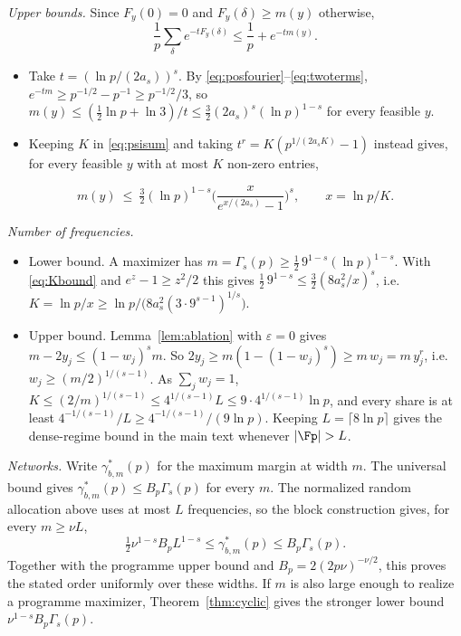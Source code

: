 \emph{Upper bounds.} Since $F_y(0)=0$ and $F_y(\delta)\ge m(y)$ otherwise,
\begin{equation}
\frac1p\sum_\delta e^{-tF_y(\delta)}\le\frac1p+e^{-tm(y)}.
\label{eq:twoterms}
\end{equation}
\begin{itemize}
\item Take $t=(\ln p/(2a_s))^s$. By \eqref{eq:posfourier}--\eqref{eq:twoterms}, $e^{-tm}\ge p^{-1/2}-p^{-1}\ge p^{-1/2}/3$, so $m(y)\le(\frac12\ln p+\ln3)/t\le\frac32(2a_s)^s(\ln p)^{1-s}$ for every feasible $y$.
\item Keeping $K$ in \eqref{eq:psisum} and taking $t^r=K(p^{1/(2a_sK)}-1)$ instead gives, for every feasible $y$ with at most $K$ non-zero entries,
\end{itemize}
\begin{equation}
m(y)\ \le\ \tfrac32(\ln p)^{1-s}\Big(\frac{x}{e^{x/(2a_s)}-1}\Big)^s,\qquad x=\ln p/K.
\label{eq:Kbound}
\end{equation}

\emph{Number of frequencies.}
\begin{itemize}
\item Lower bound. A maximizer has $m=\Gamma_s(p)\ge\tfrac12\,9^{1-s}(\ln p)^{1-s}$. With \eqref{eq:Kbound} and $e^z-1\ge z^2/2$ this gives $\tfrac12\,9^{1-s}\le\frac32(8a_s^2/x)^s$, i.e.\ $K=\ln p/x\ge\ln p/\big(8a_s^2(3\cdot9^{s-1})^{1/s}\big)$.
\item Upper bound. Lemma~\ref{lem:ablation} with $\varepsilon=0$ gives $m-2y_j\le(1-w_j)^sm$. So $2y_j\ge m(1-(1-w_j)^s)\ge m\,w_j=m\,y_j^r$, i.e.\ $w_j\ge(m/2)^{1/(s-1)}$. As $\sum_jw_j=1$, $K\le(2/m)^{1/(s-1)}\le4^{1/(s-1)}L\le9\cdot4^{1/(s-1)}\ln p$, and every share is at least $4^{-1/(s-1)}/L\ge4^{-1/(s-1)}/(9\ln p)$. Keeping $L=\lceil8\ln p\rceil$ gives the dense-regime bound in the main text whenever $|\Fp|>L$.
\end{itemize}

\emph{Networks.} Write $\gamma^*_{b,m}(p)$ for the maximum margin at width $m$. The universal bound gives $\gamma^*_{b,m}(p)\le B_p\Gamma_s(p)$ for every $m$. The normalized random allocation above uses at most $L$ frequencies, so the block construction gives, for every $m\ge\nu L$,
\[
\tfrac12\nu^{1-s}B_pL^{1-s}\le\gamma^*_{b,m}(p)\le B_p\Gamma_s(p).
\]
Together with the programme upper bound and $B_p=2(2p\nu)^{-\nu/2}$, this proves the stated order uniformly over these widths. If $m$ is also large enough to realize a programme maximizer, Theorem~\ref{thm:cyclic} gives the stronger lower bound $\nu^{1-s}B_p\Gamma_s(p)$.

